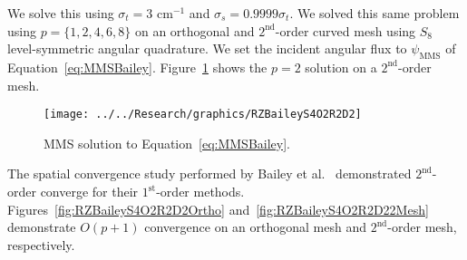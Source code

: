 \documentclass[12pt,letterpaper]{article}
\begin{document}
We solve this using $\sigma_t = 3 \text{ cm}^{-1}$ and $\sigma_s=0.9999 \sigma_t$. We solved this same problem using $p=\{1,2,4,6,8\}$ on an orthogonal and $2^\text{nd}$-order curved mesh using $S_8$ level-symmetric angular quadrature. We set the incident angular flux to $\psi_\text{MMS}$ of Equation~\ref{eq:MMSBailey}. Figure~\ref{fig:RZBaileyS4O2R2D2} shows the $p=2$ solution on a $2^\text{nd}$-order mesh.

\begin{figure}[!htb]
\centering
\texttt{[image: ../../Research/graphics/RZBaileyS4O2R2D2]}
\caption{MMS solution to Equation~\ref{eq:MMSBailey}.}
\label{fig:RZBaileyS4O2R2D2}
\end{figure}

The spatial convergence study performed by Bailey et al.~\cite{BaileyDFEMCylindrical} demonstrated $2^\text{nd}$-order converge for their $1^\text{st}$-order methods. Figures~\ref{fig:RZBaileyS4O2R2D2Ortho} and~\ref{fig:RZBaileyS4O2R2D22Mesh} demonstrate $O(p+1)$ convergence on an orthogonal mesh and $2^\text{nd}$-order mesh, respectively.
%
\end{document}

